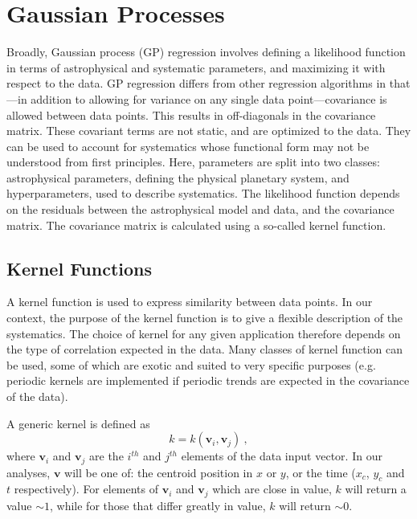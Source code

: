 \documentclass[twocolumn]{aastex61}
\begin{document}
\section{Gaussian Processes}
\label{sec:gp}
Broadly, Gaussian process (GP) regression involves defining a likelihood function in terms of astrophysical and systematic parameters, and maximizing it with respect to the data. GP regression differs from other regression algorithms in that---in addition to allowing for variance on any single data point---covariance is allowed between data points. This results in off-diagonals in the covariance matrix. These covariant terms are not static, and are optimized to the data. They can be used to account for systematics whose functional form may not be understood from first principles. Here, parameters are split into two classes: astrophysical parameters, defining the physical planetary system, and hyperparameters, used to describe systematics. The likelihood function depends on the residuals between the astrophysical model and data, and the covariance matrix. The covariance matrix is calculated using a so-called kernel function.

\subsection{Kernel Functions}
\label{sec:kernel}
A kernel function is used to express similarity between data points. In our context, the purpose of the kernel function is to give a flexible description of the systematics. The choice of kernel for any given application therefore depends on the type of correlation expected in the data. Many classes of kernel function can be used, some of which are exotic and suited to very specific purposes (e.g. periodic kernels are implemented if periodic trends are expected in the covariance of the data).

A generic kernel is defined as
\begin{equation}
  k = k(\boldsymbol{v}_{i},\boldsymbol{v}_{j})\ ,
\end{equation}
where $\boldsymbol{v}_{i}$ and $\boldsymbol{v}_{j}$ are the $i^{th}$ and $j^{th}$ elements of the data input vector. In our analyses, $\boldsymbol{v}$ will be one of: the centroid position in $x$ or $y$, or the time ($x_{c}$, $y_{c}$ and $t$ respectively). For elements of $\boldsymbol{v}_{i}$ and $\boldsymbol{v}_{j}$ which are close in value, $k$ will return a value $\sim 1$, while for those that differ greatly in value, $k$ will return $\sim 0$.
\end{document}
